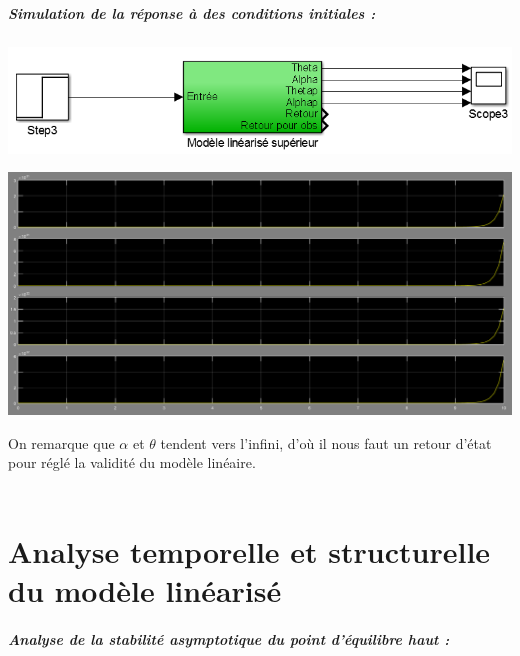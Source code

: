 \documentclass[12pt, a4paper, openany]{report}
\begin{document}
\paragraph{Simulation de la réponse à des conditions initiales :\\}


\begin{center}
\includegraphics[scale=0.5]{modelelineairesup.png}
\label{fig1} 
\end{center}


\begin{center}
\includegraphics[scale=0.4]{modelehaut.PNG}
\label{fig1} 
\end{center}

On remarque que $\alpha$ et $\theta$ tendent vers l'infini, d’où il nous faut un retour d'état pour réglé la validité du modèle linéaire.\\\\   


\chapter{Analyse temporelle et structurelle du modèle linéarisé }
\paragraph{Analyse de la stabilité asymptotique du point d'équilibre haut :\\}
\end{document}
